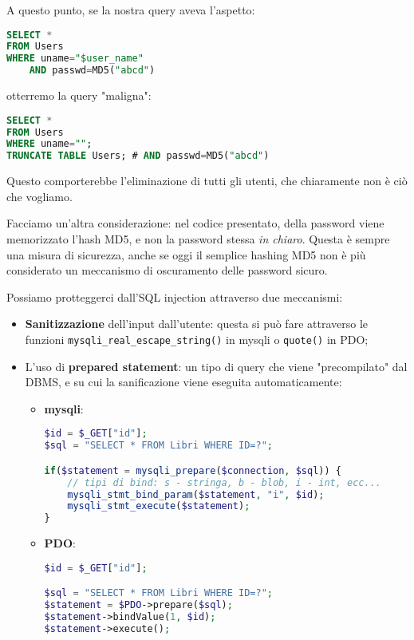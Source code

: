\documentclass[a4paper,11pt]{article}
\begin{document}
A questo punto, se la nostra query aveva l'aspetto:
\begin{lstlisting}[language=SQL, style=codestyle]	
SELECT *
FROM Users 
WHERE uname="$user_name"
	AND passwd=MD5("abcd")
\end{lstlisting}

otterremo la query "maligna":
\begin{lstlisting}[language=SQL, style=codestyle]	
SELECT *
FROM Users 
WHERE uname="";
TRUNCATE TABLE Users; # AND passwd=MD5("abcd")
\end{lstlisting}

Questo comporterebbe l'eliminazione di tutti gli utenti, che chiaramente non è ciò che vogliamo.

\par\smallskip 

Facciamo un'altra considerazione: nel codice presentato, della password viene memorizzato l'hash MD5, e non la password stessa \textit{in chiaro}.
Questa è sempre una misura di sicurezza, anche se oggi il semplice hashing MD5 non è più considerato un meccanismo di oscuramento delle password sicuro.

\par\smallskip

Possiamo protteggerci dall'SQL injection attraverso due meccanismi:
\begin{itemize}
	\item \textbf{Sanitizzazione} dell'input dall'utente: questa si può fare attraverso le funzioni \lstinline|mysqli_real_escape_string()| in mysqli o \lstinline|quote()| in PDO;
	\item L'uso di \textbf{prepared statement}: un tipo di query che viene "precompilato" dal DBMS, e su cui la sanificazione viene eseguita automaticamente:
\begin{itemize}
	\item \textbf{mysqli}:
\begin{lstlisting}[language=php, style=codestyle]	
$id = $_GET["id"];
$sql = "SELECT * FROM Libri WHERE ID=?";

if($statement = mysqli_prepare($connection, $sql)) {
	// tipi di bind: s - stringa, b - blob, i - int, ecc...
	mysqli_stmt_bind_param($statement, "i", $id);
	mysqli_stmt_execute($statement);
}
\end{lstlisting}
	\item \textbf{PDO}:
\begin{lstlisting}[language=php, style=codestyle]	
$id = $_GET["id"];

$sql = "SELECT * FROM Libri WHERE ID=?";
$statement = $PDO->prepare($sql);
$statement->bindValue(1, $id);
$statement->execute();
\end{lstlisting}
\end{itemize}
\end{itemize}
\end{document}
